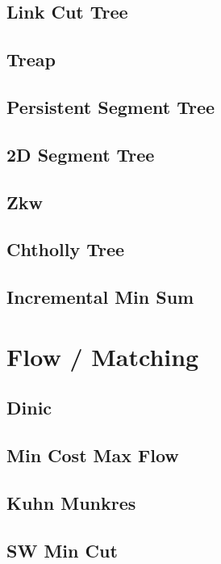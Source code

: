 \subsection{Link Cut Tree}

\subsection{Treap}

\subsection{Persistent Segment Tree}

\subsection{2D Segment Tree}

\subsection{Zkw}

\subsection{Chtholly Tree}

\subsection{Incremental Min Sum}


\section{Flow / Matching}
\subsection{Dinic}

\subsection{Min Cost Max Flow}

\subsection{Kuhn Munkres}

\subsection{SW Min Cut}

